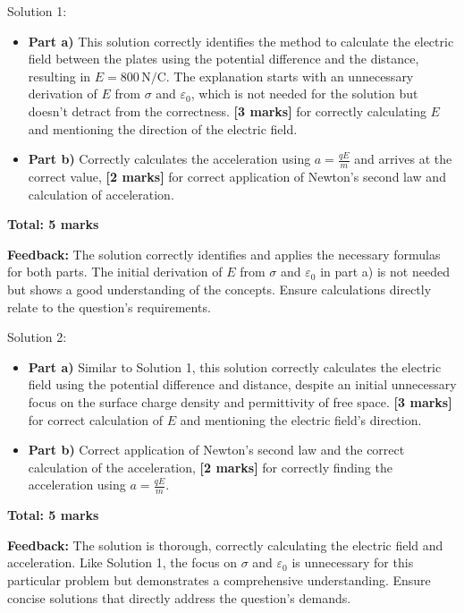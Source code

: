 \documentclass[a4paper,11pt]{article}
\begin{document}
Solution 1:

\begin{itemize}
    \item \textbf{Part a)} This solution correctly identifies the method to calculate the electric field between the plates using the potential difference and the distance, resulting in \( E = 800 \, \text{N/C} \). The explanation starts with an unnecessary derivation of \( E \) from \( \sigma \) and \( \varepsilon_0 \), which is not needed for the solution but doesn't detract from the correctness. \textbf{[3 marks]} for correctly calculating \( E \) and mentioning the direction of the electric field.
    \item \textbf{Part b)} Correctly calculates the acceleration using \( a = \frac{qE}{m} \) and arrives at the correct value, \textbf{[2 marks]} for correct application of Newton's second law and calculation of acceleration.
\end{itemize}

\textbf{Total: 5 marks}

\textbf{Feedback:} The solution correctly identifies and applies the necessary formulas for both parts. The initial derivation of \( E \) from \( \sigma \) and \( \varepsilon_0 \) in part a) is not needed but shows a good understanding of the concepts. Ensure calculations directly relate to the question's requirements.

Solution 2:

\begin{itemize}
    \item \textbf{Part a)} Similar to Solution 1, this solution correctly calculates the electric field using the potential difference and distance, despite an initial unnecessary focus on the surface charge density and permittivity of free space. \textbf{[3 marks]} for correct calculation of \( E \) and mentioning the electric field's direction.
    \item \textbf{Part b)} Correct application of Newton's second law and the correct calculation of the acceleration, \textbf{[2 marks]} for correctly finding the acceleration using \( a = \frac{qE}{m} \).
\end{itemize}

\textbf{Total: 5 marks}

\textbf{Feedback:} The solution is thorough, correctly calculating the electric field and acceleration. Like Solution 1, the focus on \( \sigma \) and \( \varepsilon_0 \) is unnecessary for this particular problem but demonstrates a comprehensive understanding. Ensure concise solutions that directly address the question's demands.
\end{document}
